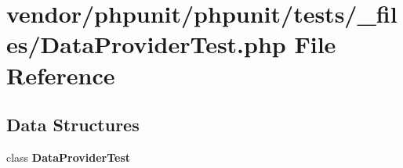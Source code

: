 \section{vendor/phpunit/phpunit/tests/\+\_\+files/\+Data\+Provider\+Test.php File Reference}
\label{_data_provider_test_8php}
\subsection*{Data Structures}
\begin{DoxyCompactItemize}
\item 
class {\bf Data\+Provider\+Test}
\end{DoxyCompactItemize}
